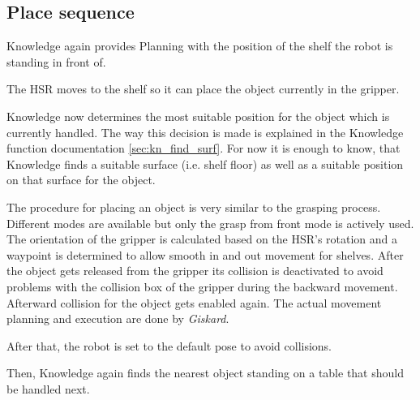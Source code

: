 \documentclass[main.tex]{subfiles}
\begin{document}
	\subsection{Place sequence}
	
	\begin{knowledge}
	Knowledge again provides Planning with the position of the shelf the robot is standing in front of.
	\end{knowledge}
	
	\begin{navigation}
	The HSR moves to the shelf so it can place the object currently in the gripper.
	\end{navigation}
	
	\begin{knowledge}
	Knowledge now determines the most suitable position for the object which is currently handled. The way this decision is made is explained in the Knowledge function documentation \ref{sec:kn_find_surf}. For now it is enough to know, that Knowledge finds a suitable surface (i.e. shelf floor) as well as a suitable position on that surface for the object.
	\end{knowledge}
	
	\begin{manipulation}
	The procedure for placing an object is very similar to the grasping process. Different modes are available but only the grasp from front mode is actively used. The orientation of the gripper is calculated based on the HSR's rotation and a waypoint is determined to allow smooth in and out movement for shelves. After the object gets released from the gripper its collision is deactivated to avoid problems with the collision box of the gripper during the backward movement. Afterward collision for the object gets enabled again. The actual movement planning and execution are done by \textit{Giskard}.   
	\end{manipulation}
	
	
	\begin{manipulation}
	After that, the robot is set to the default pose to avoid collisions.
	\end{manipulation}
	
	
	\begin{knowledge}
	Then, Knowledge again finds the nearest object standing on a table that should be handled next.
	\end{knowledge}
	
\end{document}
